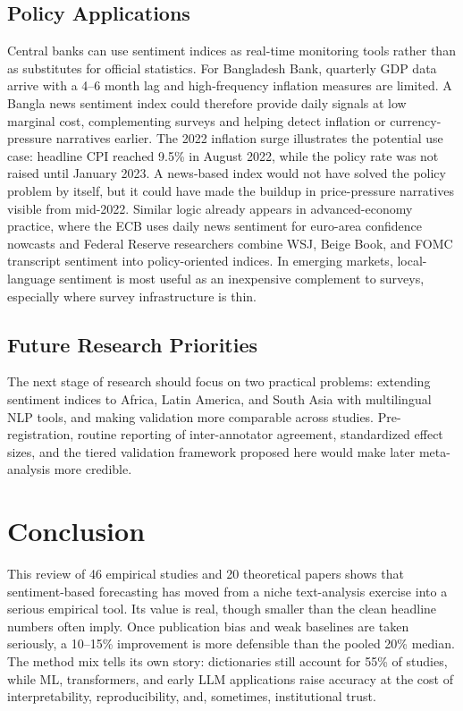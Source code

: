 \documentclass[12pt,oneside]{article}
\begin{document}
\subsection{Policy Applications}

Central banks can use sentiment indices as real-time monitoring tools rather than as substitutes for official statistics. For Bangladesh Bank, quarterly GDP data arrive with a 4--6 month lag and high-frequency inflation measures are limited. A Bangla news sentiment index could therefore provide daily signals at low marginal cost, complementing surveys and helping detect inflation or currency-pressure narratives earlier. The 2022 inflation surge illustrates the potential use case: headline CPI reached 9.5\% in August 2022, while the policy rate was not raised until January 2023. A news-based index would not have solved the policy problem by itself, but it could have made the buildup in price-pressure narratives visible from mid-2022. Similar logic already appears in advanced-economy practice, where the ECB uses daily news sentiment for euro-area confidence nowcasts and Federal Reserve researchers combine WSJ, Beige Book, and FOMC transcript sentiment into policy-oriented indices. In emerging markets, local-language sentiment is most useful as an inexpensive complement to surveys, especially where survey infrastructure is thin.

\subsection{Future Research Priorities}

The next stage of research should focus on two practical problems: extending sentiment indices to Africa, Latin America, and South Asia with multilingual NLP tools, and making validation more comparable across studies. Pre-registration, routine reporting of inter-annotator agreement, standardized effect sizes, and the tiered validation framework proposed here would make later meta-analysis more credible.

\section{Conclusion}

This review of 46 empirical studies and 20 theoretical papers shows that sentiment-based forecasting has moved from a niche text-analysis exercise into a serious empirical tool. Its value is real, though smaller than the clean headline numbers often imply. Once publication bias and weak baselines are taken seriously, a 10--15\% improvement is more defensible than the pooled 20\% median. The method mix tells its own story: dictionaries still account for 55\% of studies, while ML, transformers, and early LLM applications raise accuracy at the cost of interpretability, reproducibility, and, sometimes, institutional trust.
\end{document}
